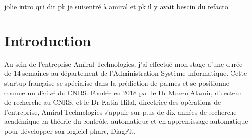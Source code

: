 jolie intro qui dit pk je suisentré à amiral et pk il y avait besoin du refacto



\section{Introduction}
Au sein de l'entreprise Amiral Technologies, j'ai effectué mon stage d'une durée de 14 semaines au département de l'Administration Système Informatique.
Cette startup française se spécialise dans la prédiction de pannes et se positionne comme un dérivé du CNRS.
Fondée en 2018 par le Dr Mazen Alamir, directeur de recherche au CNRS, et le Dr Katia Hilal, directrice des opérations de l'entreprise, Amiral Technologies s'appuie sur plus de dix années de recherche académique en théorie du contrôle, automatique et en apprentissage automatique pour développer son logiciel phare, DiagFit.
